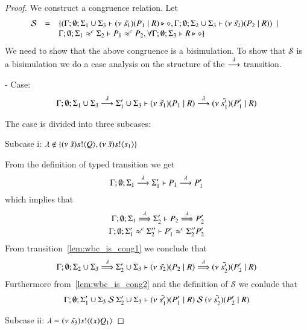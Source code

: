 \begin{proof}
	\noi We construct a congruence relation. Let
	\[
	\begin{array}{rcl}
		\mathcal{S} &=&	\{(\Gamma; \emptyset; \Sigma_1 \cup \Sigma_3 \vdash (\nu\ \tilde{s_1})(P_1 \;|\; R) \triangleright \diamond, \Gamma; \emptyset; \Sigma_2 \cup \Sigma_3 \vdash (\nu\ \tilde{s_2})(P_2 \;|\; R)) \ \ |\ \  \\
		& &	\Gamma;\emptyset;\Sigma_1 \approx^{c} \Sigma_2 \vdash P_1 \approx^{c} P_2, \forall \Gamma; \emptyset; \Sigma_3 \vdash R \triangleright \diamond\}
	\end{array}
	\]
	\noi We need to show that the above congruence is a bisimulation.
	To show that $\mathcal{S}$ is a bisimulation we do a case analysis on the structure
	of the $\stackrel{\lambda}{\longrightarrow}$ transition.


	\noi - Case: 
	\[
		\Gamma; \emptyset; \Sigma_1 \cup \Sigma_3 \stackrel{\lambda}{\longrightarrow} \Sigma_1' \cup \Sigma_3 \vdash (\nu\ \tilde{s_1})(P_1 \;|\; R) \stackrel{\lambda}{\longrightarrow} (\nu\ \tilde{s_1'})(P_1' \;|\; R)
	\]

	\noi The case is divided into three subcases:

	\noi Subcase i: $\lambda \notin \{(\nu\ \tilde{s}) s ! \langle Q \rangle, (\nu\ \tilde{s}) s ! \langle s_1 \rangle\}$

	\noi From the definition of typed transition we get
	\[
		\Gamma; \emptyset; \Sigma_1 \stackrel{\lambda}{\longrightarrow} \Sigma_1' \vdash P_1 \stackrel{\lambda}{\longrightarrow} P_1'
	\]
	\noi which implies that
%
	\begin{eqnarray}
		\Gamma; \emptyset; \Sigma_1 \stackrel{\lambda}{\Longrightarrow} \Sigma_2' \vdash P_2 \stackrel{\lambda}{\Longrightarrow} P_2' \label{lem:wbc_is_cong1}\\
		\Gamma; \emptyset; \Sigma_1' \approx^{c} \Sigma_2'' \vdash P_1' \approx^{c} \Sigma_2'' P_2' \label{lem:wbc_is_cong2}
	\end{eqnarray}
%
	\noi From transition~\ref{lem:wbc_is_cong1} we conclude that 
	\[
		\Gamma;\emptyset; \Sigma_2 \cup \Sigma_3 \stackrel{\lambda}{\Longrightarrow} \Sigma_2' \cup \Sigma_3 \vdash (\nu\ \tilde{s_2})(P_2 \;|\; R) \stackrel{\lambda}{\Longrightarrow} (\nu\ \tilde{s_2'})(P_2' \;|\; R)
	\]
%
	\noi Furthermore from~\ref{lem:wbc_is_cong2} and the definition of $\mathcal{S}$ we conlude that
	\[
		\Gamma; \emptyset; \Sigma_1' \cup \Sigma_3\ \mathcal{S}\ \Sigma_2' \cup \Sigma_3 \proves \newsp{\tilde{s_1'}}{P_1' \Par R}\ \mathcal{S}\ \newsp{\tilde{s_2'}}{P_2' \Par R}
	\]

	\noi Subcase ii: $\lambda = (\nu\ \tilde{s_3}) s ! \langle (x)Q_1 \rangle$


\end{proof}
